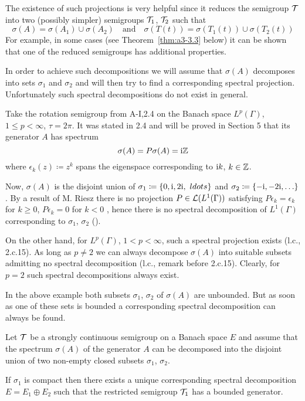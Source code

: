 The existence of such projections is very helpful since it reduces the semigroup $\mathcal{T}$ into two (possibly simpler) semigroups $\mathcal{T}_{1}$, $\mathcal{T}_{2}$ such that
\[
\sigma(A) = \sigma(A_{1}) \cup \sigma(A_{2}) \quad \text{and} \quad \sigma(T(t)) = \sigma(T_{1}(t)) \cup \sigma(T_{2}(t))
\]
For example, in some cases (see Theorem~\ref{thm:a3-3.3} below) it can be shown that one of the reduced semigroups has additional properties.

In order to achieve such decompositions we will assume that $\sigma(A)$ decomposes into sets $\sigma_{1}$ and $\sigma_{2}$ and will then try to find a corresponding spectral projection.
Unfortunately such spectral decompositions do not exist in general.
\begin{example}\label{ex:a3-3.2}
Take the rotation semigroup from A-I,2.4 on the Banach space $L^{p}(\Gamma)$, $1 \leq p < \infty$, $\tau = 2\pi$.
It was stated in 2.4 and will be proved in Section 5 that its generator $A$ has spectrum
\[
\sigma(A) = P\sigma(A) = \mathrm{i}\mathbb{Z}
\]
where $\epsilon_{k}(z) \coloneqq z^{k}$ spans the eigenspace corresponding to $\mathrm{i} k$, $k \in \mathbb{Z}$.

Now, $\sigma(A)$ is the disjoint union of 
$\sigma_{1} \coloneqq \{0,\mathrm{i} ,2\mathrm{i},\ ldots\}$ 
and $\sigma_{2} \coloneqq \{-\mathrm{i}, -2\mathrm{i}, \ldots\}$.
By a result of M. Riesz there is no projection $P \in \mathcal{L}(L^{1}(\Gamma))$ satisfying $P\epsilon_{k} = \epsilon_{k}$ for $k \geq 0$, $P\epsilon_{k} = 0$ for $k < 0$ , hence there is no spectral decomposition of $L^{1}(\Gamma)$ corresponding to $\sigma_{1}$, $\sigma_{2}$ (\citet[p.165]{lindenstraustzafriri:1979}).

On the other hand, for $L^{p}(\Gamma)$, $1 < p < \infty$, such a spectral projection exists (l.c., 2.c.15).
As long as $p \neq 2$ we can always decompose $\sigma(A)$ into suitable subsets admitting no spectral decomposition (l.c., remark before 2.c.15).
Clearly, for $p = 2$ such spectral decompositions always exist.
\end{example}
In the above example both subsets $\sigma_{1}$, $\sigma_{2}$ of $\sigma(A)$ are unbounded.
But as soon as one of these sets is bounded a corresponding spectral decomposition can always be found.
\begin{theorem}\label{thm:a3-3.3}
Let $\mathcal{T}$ be a strongly continuous semigroup on a Banach space $E$ and assume that the spectrum $\sigma(A)$ of the generator $A$ can be decomposed into the disjoint union of two non-empty closed subsets $\sigma_{1}$, $\sigma_{2}$.

If $\sigma_{1}$ is compact then there exists a unique corresponding spectral decomposition $E = E_{1} \oplus E_{2}$ such that the restricted semigroup $\mathcal{T}_{1}$ has a bounded generator.
\end{theorem}
